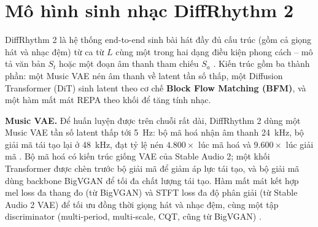 \documentclass[a4paper,13pt,oneside]{report}
\begin{document}
\section{Mô hình sinh nhạc DiffRhythm 2}
\label{sec:diffrhythm2_framework}

DiffRhythm 2 là hệ thống end-to-end sinh bài hát đầy đủ cấu trúc (gồm cả giọng hát và nhạc đệm) từ ca từ $L$ cùng một trong hai dạng điều kiện phong cách -- mô tả văn bản $S_t$ hoặc một đoạn âm thanh tham chiếu $S_a$ \cite{diffrhythm2}. Kiến trúc gồm ba thành phần: một Music VAE nén âm thanh về latent tần số thấp, một Diffusion Transformer (DiT) sinh latent theo cơ chế \textbf{Block Flow Matching (BFM)}, và một hàm mất mát REPA theo khối để tăng tính nhạc.

\textbf{Music VAE.} Để huấn luyện được trên chuỗi rất dài, DiffRhythm 2 dùng một Music VAE tần số latent thấp tới 5~Hz: bộ mã hoá nhận âm thanh 24~kHz, bộ giải mã tái tạo lại ở 48~kHz, đạt tỷ lệ nén $4.800\times$ lúc mã hoá và $9.600\times$ lúc giải mã \cite{diffrhythm2}. Bộ mã hoá có kiến trúc giống VAE của Stable Audio 2; một khối Transformer được chèn trước bộ giải mã để giảm áp lực tái tạo, và bộ giải mã dùng backbone BigVGAN \cite{bigvgan} để tối đa chất lượng tái tạo. Hàm mất mát kết hợp mel loss đa thang đo (từ BigVGAN) và STFT loss đa độ phân giải (từ Stable Audio 2 VAE) để tối ưu đồng thời giọng hát và nhạc đệm, cùng một tập discriminator (multi-period, multi-scale, CQT, cũng từ BigVGAN) \cite{diffrhythm2}.
\end{document}
